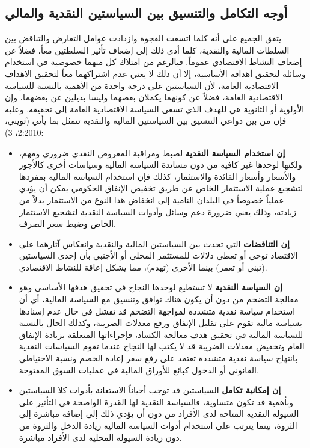 \documentclass[10pt,a4paper]{report}
\begin{document}
\begin{doublespacing}
\subsection{أوجه التكامل والتنسيق بين السياستين النقدية والمالي}
يتفق الجميع على أنه كلما اتسعت الفجوة وازدادت عوامل التعارض والتناقض بين السلطات المالية والنقدية، كلما أدى ذلك إلى إضعاف تأثير السلطتين معاً، فضلاً عن إضعاف النشاط الاقتصادي عموماً. فبالرغم من امتلاك كل منهما خصوصية في استخدام وسائله لتحقيق أهدافه الأساسية، إلا أن ذلك لا يعني عدم اشتراكهما معاً لتحقيق الأهداف الاقتصادية العامة، لأن السياستين على درجة واحدة من الأهمية بالنسبة للسياسة الاقتصادية العامة، فضلاً عن كونهما يكملان بعضهما وليسا بديلين عن بعضهما، وإن الأولوية أو الثانوية هي للهدف الذي تسعى السياسة الاقتصادية العامة إلى تحقيقه.  
وعليه فإن من بين دواعي التنسيق بين السياستين المالية والنقدية تتمثل بما يأتي ({ثويني، 2:2010، 3}):  
\begin{itemize}
	\item \textbf{إن استخدام السياسة النقدية} لضبط ومراقبة المعروض النقدي ضروري ومهم، ولكنها لوحدها غير كافية من دون مساندة السياسة المالية وسياسات أخرى كالأجور والأسعار وأسعار الفائدة والاستثمار، كذلك فإن استخدام السياسة المالية بمفردها لتشجيع عملية الاستثمار الخاص عن طريق تخفيض الإنفاق الحكومي يمكن أن يؤدي عملياً خصوصاً في البلدان النامية إلى انخفاض هذا النوع من الاستثمار بدلاً من زيادته، وذلك يعني ضرورة دعم وسائل وأدوات السياسة النقدية لتشجيع الاستثمار الخاص وضبط سعر الصرف.
	\item \textbf{إن التناقضات} التي تحدث بين السياستين المالية والنقدية وانعكاس آثارهما على الاقتصاد توحي أو تعطي دلالات للمستثمر المحلي أو الأجنبي بأن إحدى السياستين (تبني أو تعمر) بينما الأخرى (تهدم)، مما يشكل إعاقة للنشاط الاقتصادي.
	\item \textbf{إن السياسة النقدية} لا تستطيع لوحدها النجاح في تحقيق هدفها الأساسي وهو معالجة التضخم من دون أن يكون هناك توافق وتنسيق مع السياسة المالية، أي أن استخدام سياسة نقدية متشددة لمواجهة التضخم قد تفشل في حال عدم إسنادها بسياسة مالية تقوم على تقليل الإنفاق ورفع معدلات الضريبة، وكذلك الحال بالنسبة للسياسة المالية في تحقيق هدف معالجة الكساد، فإجراءاتها المتعلقة بزيادة الإنفاق العام وتخفيض معدلات الضريبة قد لا يكتب لها النجاح عندما تقوم السياسات النقدية بانتهاج سياسة نقدية متشددة تعتمد على رفع سعر إعادة الخصم ونسبة الاحتياطي القانوني أو الدخول كبائع للأوراق المالية في عمليات السوق المفتوحة.
	\item \textbf{إن إمكانية تكامل} السياستين قد توجب أحياناً الاستعانة بأدوات كلا السياستين وبأهمية قد تكون متساوية، فالسياسة النقدية لها القدرة الواضحة في التأثير على السيولة النقدية المتاحة لدى الأفراد من دون أن يؤدي ذلك إلى إضافة مباشرة إلى الثروة، بينما يترتب على استخدام أدوات السياسة المالية زيادة الدخل والثروة من دون زيادة السيولة المحلية لدى الأفراد مباشرة.

\end{itemize}
\end{doublespacing}
\end{document}
